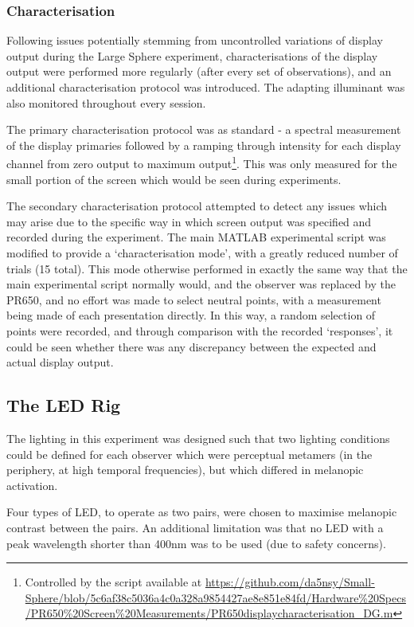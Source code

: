 \subsubsection{Characterisation}

Following issues potentially stemming from uncontrolled variations of display output during the Large Sphere experiment, characterisations of the display output were performed more regularly (after every set of observations), and an additional characterisation protocol was introduced. The adapting illuminant was also monitored throughout every session.

The primary characterisation protocol was as standard - a spectral measurement of the display primaries followed by a ramping through intensity for each display channel from zero output to maximum output\footnote{Controlled by the script available at \url{https://github.com/da5nsy/Small-Sphere/blob/5c6af38c5036a4c0a328a9854427ae8e851e84fd/Hardware\%20Specs/PR650\%20Screen\%20Measurements/PR650displaycharacterisation_DG.m}}. This was only measured for the small portion of the screen which would be seen during experiments.

The secondary characterisation protocol attempted to detect any issues which may arise due to the specific way in which screen output was specified and recorded during the experiment. The main MATLAB experimental script was modified to provide a `characterisation mode', with a greatly reduced number of trials (15 total). This mode otherwise performed in exactly the same way that the main experimental script normally would, and the observer was replaced by the \gls{PR650}, and no effort was made to select neutral points, with a measurement being made of each presentation directly. In this way, a random selection of points were recorded, and through comparison with the recorded `responses', it could be seen whether there was any discrepancy between the expected and actual display output.

\subsection{The LED Rig}

The lighting in this experiment was designed such that two lighting conditions could be defined for each observer which were perceptual metamers (in the periphery, at high temporal frequencies), but which differed in melanopic activation.

Four types of \gls{LED}, to operate as two pairs, were chosen to maximise melanopic contrast between the pairs. An additional limitation was that no LED with a peak wavelength shorter than 400nm was to be used (due to safety concerns).

